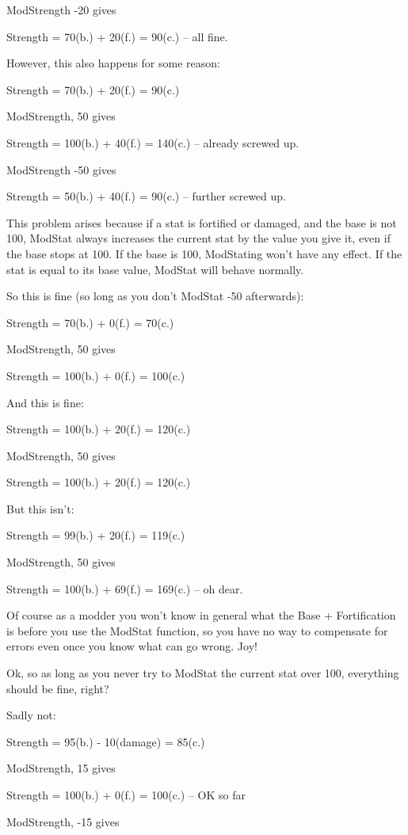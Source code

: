 ModStrength -20 gives

Strength = 70(b.) + 20(f.) = 90(c.) -- all fine.

However, this also happens for some reason:

Strength = 70(b.) + 20(f.) = 90(c.)

ModStrength, 50 gives

Strength = 100(b.) + 40(f.) = 140(c.) -- already screwed up.

ModStrength -50 gives

Strength = 50(b.) + 40(f.) = 90(c.) -- further screwed up.

This problem arises because if a stat is fortified or damaged, and the
base is not 100, ModStat always increases the current stat by the value
you give it, even if the base stops at 100. If the base is 100,
ModStating won't have any effect. If the stat is equal to its base
value, ModStat will behave normally.

So this is fine (so long as you don't ModStat -50 afterwards):

Strength = 70(b.) + 0(f.) = 70(c.)

ModStrength, 50 gives

Strength = 100(b.) + 0(f.) = 100(c.)

And this is fine:

Strength = 100(b.) + 20(f.) = 120(c.)

ModStrength, 50 gives

Strength = 100(b.) + 20(f.) = 120(c.)

But this isn't:

Strength = 99(b.) + 20(f.) = 119(c.)

ModStrength, 50 gives

Strength = 100(b.) + 69(f.) = 169(c.) -- oh dear.

Of course as a modder you won't know in general what the Base +
Fortification is before you use the ModStat function, so you have no way
to compensate for errors even once you know what can go wrong. Joy!

Ok, so as long as you never try to ModStat the current stat over 100,
everything should be fine, right?

Sadly not:

Strength = 95(b.) - 10(damage) = 85(c.)

ModStrength, 15 gives

Strength = 100(b.) + 0(f.) = 100(c.) -- OK so far

ModStrength, -15 gives

